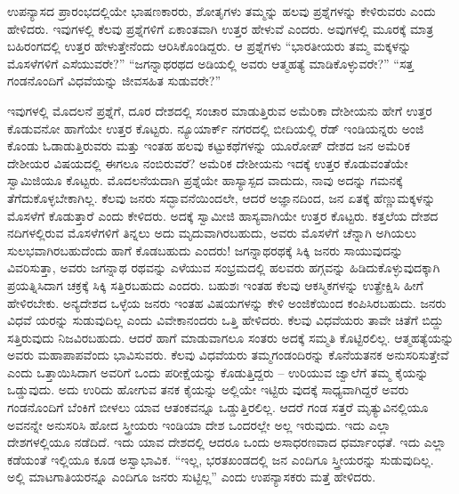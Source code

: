 ಉಪನ್ಯಾಸದ ಪ್ರಾರಂಭದಲ್ಲಿಯೇ ಭಾಷಣಕಾರರು, ಶೋತೃಗಳು ತಮ್ಮನ್ನು ಹಲವು ಪ್ರಶ್ನೆಗಳನ್ನು ಕೇಳಿರುವರು ಎಂದು ಹೇಳಿದರು. ಇವುಗಳಲ್ಲಿ ಕೆಲವು ಪ್ರಶ್ನೆಗಳಿಗೆ ಏಕಾಂತವಾಗಿ ಉತ್ತರ ಹೇಳುವೆ ಎಂದರು. ಅವುಗಳಲ್ಲಿ ಮೂರಕ್ಕೆ ಮಾತ್ರ ಬಹಿರಂಗದಲ್ಲಿ ಉತ್ತರ ಹೇಳುತ್ತೇನೆಂದು ಆರಿಸಿಕೊಂಡಿದ್ದರು. ಆ ಪ್ರಶ್ನೆಗಳು “ಭಾರತೀಯರು ತಮ್ಮ ಮಕ್ಕಳನ್ನು ಮೊಸಳೆಗಳಿಗೆ ಎಸೆಯುವರೇ?” “ಜಗನ್ನಾಥರಥದ ಅಡಿಯಲ್ಲಿ ಅವರು ಆತ್ಮಹತ್ಯೆ ಮಾಡಿಕೊಳ್ಳುವರೇ?” “ಸತ್ತ ಗಂಡನೊಂದಿಗೆ ವಿಧವೆಯನ್ನು ಜೀವಸಹಿತ ಸುಡುವರೇ?”

ಇವುಗಳಲ್ಲಿ ಮೊದಲನೆ ಪ್ರಶ್ನೆಗೆ, ದೂರ ದೇಶದಲ್ಲಿ ಸಂಚಾರ ಮಾಡುತ್ತಿರುವ ಅಮೆರಿಕಾ ದೇಶೀಯನು ಹೇಗೆ ಉತ್ತರ ಕೊಡುವನೋ ಹಾಗೆಯೇ ಉತ್ತರ ಕೊಟ್ಟರು. ನ್ಯೂಯಾರ್ಕ್​ ನಗರದಲ್ಲಿ ಬೀದಿಯಲ್ಲಿ ರೆಡ್​ ಇಂಡಿಯನ್ನರು ಅಂಜಿ ಕೊಂಡು ಓಡಾಡುತ್ತಿರುವರು ಮತ್ತು ಇಂತಹ ಹಲವು ಕಟ್ಟುಕಥೆಗಳನ್ನು ಯೂರೋಪ್​ ದೇಶದ ಜನ ಅಮೆರಿಕ ದೇಶೀಯರ ವಿಷಯದಲ್ಲಿ ಈಗಲೂ ನಂಬಿರುವರೆ? ಅಮೆರಿಕ ದೇಶೀಯನು ಇದಕ್ಕೆ ಉತ್ತರ ಕೊಡುವಂತೆಯೇ ಸ್ವಾಮಿಜಿಯೂ ಕೊಟ್ಟರು. ಮೊದಲನೆಯದಾಗಿ ಪ್ರಶ್ನೆಯೇ ಹಾಸ್ಯಾಸ್ಪದ ವಾದುದು, ನಾವು ಅದನ್ನು ಗಮನಕ್ಕೆ ತೆಗೆದುಕೊಳ್ಳಬೇಕಾಗಿಲ್ಲ. ಕೆಲವು ಜನರು ಸದ್ಭಾವನೆಯಿಂದಲೇ, ಆದರೆ ಅಜ್ಞಾನದಿಂದ, ಜನ ಏತಕ್ಕೆ ಹೆಣ್ಣುಮಕ್ಕಳನ್ನು ಮೊಸಳೆಗೆ ಕೊಡುತ್ತಾರೆ ಎಂದು ಕೇಳಿದರು. ಅದಕ್ಕೆ ಸ್ವಾಮೀಜಿ ಹಾಸ್ಯವಾಗಿಯೇ ಉತ್ತರ ಕೊಟ್ಟರು. ಕತ್ತಲೆಯ ದೇಶದ ನದಿಗಳಲ್ಲಿರುವ ಮೊಸಳೆಗಳಿಗೆ ತಿನ್ನಲು ಅದು ಮೃದುವಾಗಿರಬಹುದು, ಅವರು ಮೊಸಳೆಗೆ ಚೆನ್ನಾಗಿ ಅಗಿಯಲು ಸುಲಭವಾಗಿರಬಹುದೆಂದು ಹಾಗೆ ಕೊಡಬಹುದು ಎಂದರು! ಜಗನ್ನಾಥರಥಕ್ಕೆ ಸಿಕ್ಕಿ ಜನರು ಸಾಯುವುದನ್ನು ವಿವರಿಸುತ್ತಾ, ಅವರು ಜಗನ್ನಾಥ ರಥವನ್ನು ಎಳೆಯುವ ಸಂಭ್ರಮದಲ್ಲಿ ಹಲವರು ಹಗ್ಗವನ್ನು ಹಿಡಿದುಕೊಳ್ಳುವುದಕ್ಕಾಗಿ ಪ್ರಯತ್ನಿಸಿದಾಗ ಚಕ್ರಕ್ಕೆ ಸಿಕ್ಕಿ ಸತ್ತಿರಬಹುದು ಎಂದರು. ಬಹುಶಃ ಇಂತಹ ಕೆಲವು ಆಕಸ್ಮಿಕಗಳನ್ನು ಉತ್ಪ್ರೇಕ್ಷಿಸಿ ಹೀಗೆ ಹೇಳಿರಬೇಕು. ಅನ್ಯದೇಶದ ಒಳ್ಳೆಯ ಜನರು ಇಂತಹ ವಿಷಯಗಳನ್ನು ಕೇಳಿ ಅಂಜಿಕೆಯಿಂದ ಕಂಪಿಸಿರಬಹುದು. ಜನರು ವಿಧವೆ ಯರನ್ನು ಸುಡುವುದಿಲ್ಲ ಎಂದು ವಿವೇಕಾನಂದರು ಒತ್ತಿ ಹೇಳಿದರು. ಕೆಲವು ವಿಧವೆಯರು ತಾವೇ ಚಿತೆಗೆ ಬಿದ್ದು ಸತ್ತಿರುವುದು ನಿಜವಿರಬಹುದು. ಆದರೆ ಹಾಗೆ ಮಾಡುವಾಗಲೂ ಸಂತರು ಅದಕ್ಕೆ ಸಮ್ಮತಿ ಕೊಟ್ಟಿರಲಿಲ್ಲ. ಆತ್ಮಹತ್ಯೆಯನ್ನು ಅವರು ಮಹಾಪಾಪವೆಂದು ಭಾವಿಸುವರು. ಕೆಲವು ವಿಧವೆಯರು ತಮ್ಮಗಂಡಂದಿರನ್ನು ಕೊನೆಯತನಕ ಅನುಸರಿಸುತ್ತೇವೆ ಎಂದು ಒತ್ತಾಯಿಸಿದಾಗ ಅವರಿಗೆ ಒಂದು ಪರೀಕ್ಷೆಯನ್ನು ಕೊಡುತ್ತಿದ್ದರು – ಉರಿಯುವ ಜ್ವಾಲೆಗೆ ತಮ್ಮ ಕೈಯನ್ನು ಒಡ್ಡುವುದು. ಅದು ಉರಿದು ಹೋಗುವ ತನಕ ಕೈಯನ್ನು ಅಲ್ಲಿಯೇ ಇಟ್ಟಿರು ವುದಕ್ಕೆ ಸಾಧ್ಯವಾಗಿದ್ದರೆ ಅವರು ಗಂಡನೊಂದಿಗೆ ಬೆಂಕಿಗೆ ಬೀಳಲು ಯಾವ ಆತಂಕವನ್ನೂ ಒಡ್ಡುತ್ತಿರಲಿಲ್ಲ. ಆದರೆ ಗಂಡ ಸತ್ತರೆ ಮೃತ್ಯುವಿನಲ್ಲಿಯೂ ಅವನನ್ನೇ ಅನುಸರಿಸಿ ಹೋದ ಸ್ತ್ರೀಯರು ಇಂಡಿಯಾ ದೇಶ ಒಂದರಲ್ಲೇ ಅಲ್ಲ ಇರುವುದು. ಇದು ಎಲ್ಲಾ ದೇಶಗಳಲ್ಲಿಯೂ ನಡೆದಿದೆ. ಇದು ಯಾವ ದೇಶದಲ್ಲಿ ಆದರೂ ಒಂದು ಅಸಾಧರಣವಾದ ಧರ್ಮಾಂಧತೆ. ಇದು ಎಲ್ಲಾ ಕಡೆಯಂತೆ ಇಲ್ಲಿಯೂ ಕೂಡ ಅಸ್ವಾಭಾವಿಕ. “ಇಲ್ಲ, ಭರತಖಂಡದಲ್ಲಿ ಜನ ಎಂದಿಗೂ ಸ್ತ್ರೀಯರನ್ನು ಸುಡುವುದಿಲ್ಲ. ಅಲ್ಲಿ ಮಾಟಗಾತಿಯರನ್ನೂ ಎಂದಿಗೂ ಜನರು ಸುಟ್ಟಿಲ್ಲ” ಎಂದು ಉಪನ್ಯಾಸಕರು ಮತ್ತೆ ಹೇಳಿದರು.

